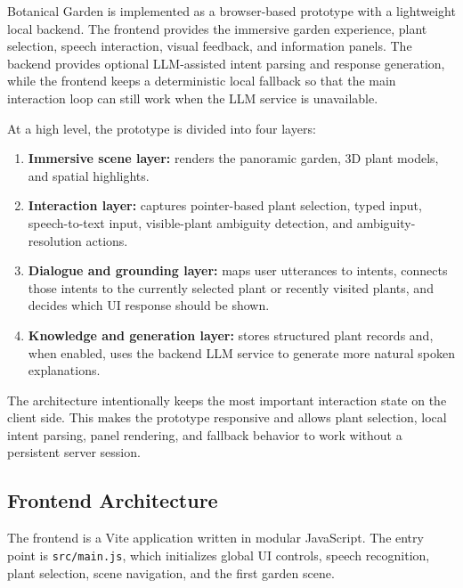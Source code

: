 \documentclass[12pt,a4paper]{article}
\begin{document}
Botanical Garden is implemented as a browser-based prototype with a lightweight local
backend. The frontend provides the immersive garden experience, plant
selection, speech interaction, visual feedback, and information panels. The
backend provides optional LLM-assisted intent parsing and response generation,
while the frontend keeps a deterministic local fallback so that the main
interaction loop can still work when the LLM service is unavailable.

At a high level, the prototype is divided into four layers:

\begin{enumerate}[label=\arabic*.]

    \item \textbf{Immersive scene layer:} renders the panoramic garden, 3D plant
    models, and spatial highlights.

    \item \textbf{Interaction layer:} captures pointer-based plant selection,
    typed input, speech-to-text input, visible-plant ambiguity detection, and
    ambiguity-resolution actions.

    \item \textbf{Dialogue and grounding layer:} maps user utterances to intents,
    connects those intents to the currently selected plant or recently visited
    plants, and decides which UI response should be shown.

    \item \textbf{Knowledge and generation layer:} stores structured plant
    records and, when enabled, uses the backend LLM service to generate more
    natural spoken explanations.
\end{enumerate}

The architecture intentionally keeps the most important interaction state on
the client side. This makes the prototype responsive and allows plant
selection, local intent parsing, panel rendering, and fallback behavior to work
without a persistent server session.

\subsection{Frontend Architecture}

The frontend is a Vite application written in modular JavaScript. The entry
point is \texttt{src/main.js}, which initializes global UI controls, speech
recognition, plant selection, scene navigation, and the first garden scene.
\end{document}

